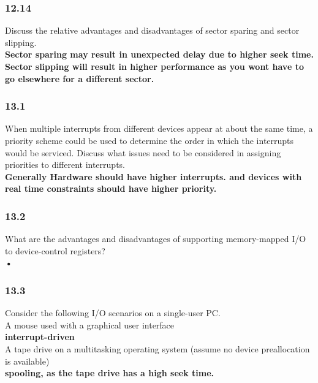 \documentclass[a4paper,10pt,titlepage]{report}
\begin{document}
\subsubsection{12.14} Discuss the relative advantages and disadvantages of sector sparing and sector slipping.\\
\hspace{15mm} \textbf{Sector sparing may result in unexpected delay due to higher seek time.} \\
\hspace{15mm} \textbf{Sector slipping will result in higher performance as you wont have to go elsewhere for a different sector.} \\

\subsubsection{13.1} When multiple interrupts from different devices appear at about the same time, a priority scheme could be used to determine the order in which the interrupts would be serviced. Discuss what issues need to be considered in assigning priorities to different interrupts. \\
\hspace{15mm} \textbf{Generally Hardware should have higher interrupts. and devices with real time constraints should have higher priority.} \\


\subsubsection{13.2} What are the advantages and disadvantages of supporting memory-mapped I/O to device-control registers? \\
\hspace{15mm} \textbf{•} \\


\subsubsection{13.3} Consider the following I/O scenarios on a single-user PC.\\
\hspace{10mm} 	A mouse used with a graphical user interface \\
\hspace{15mm} \textbf{interrupt-driven} \\

\hspace{10mm} 	A tape drive on a multitasking operating system (assume no device preallocation is available) \\
\hspace{15mm} \textbf{spooling, as the tape drive has a high seek time.} \\
\end{document}
